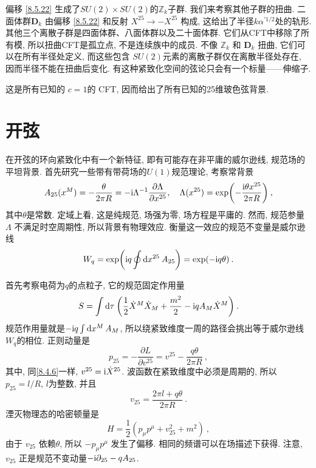 偏移 \eqref{8.5.22} 生成了$S U(2) \times S U(2) $的$\mathds{Z}_{k}$子群. 我们来考察其他子群的扭曲. 
二面体群$\mathbf{D}_{k}$ 由偏移 \eqref{8.5.22} 和反射 $X^{25} \rightarrow-X^{25}$ 构成, 这给出了半径$k \alpha^{\prime 1/2}$处的轨形. 
其他三个离散子群是四面体群、八面体群以及二十面体群. 它们从CFT中移除了所有模, 所以扭曲CFT是孤立点, 不是连续族中的成员. 
不像 $\mathds{Z}_{k}$ 和 $\mathbf{D}_{k}$ 扭曲, 它们可以在所有半径处定义, 而这些包含 $S U(2)$元素的离散子群仅在离散半径处存在, 
因而半径不能在扭曲后变化. 有这种紧致化空间的弦论只会有一个标量——伸缩子. 

这是所有已知的 $c=1$的 CFT, 因而给出了所有已知的25维玻色弦背景.


\section{开弦} \label{sec:8.6}%

在开弦的环向紧致化中有一个新特征, 即有可能存在非平庸的威尔逊线, 规范场的平坦背景. 首先研究一些带有带荷场的$U(1)$规范理论, 考察常背景
\begin{equation}
	A_{25}(x^{M})=-\frac{\theta}{2 \pi R}=-\mathrm{i} \Lambda^{-1} \frac{\partial \Lambda}{\partial x^{25}}, \quad 
	\Lambda(x^{25})=\exp \biggl(-\frac{\mathrm{i} \theta x^{25}}{2 \pi R}\biggr) \:, \label{8.6.1}
\end{equation}
其中$\theta$是常数. 定域上看, 这是纯规范, 场强为零, 场方程是平庸的. 然而, 规范参量 $\Lambda$ 不满足时空周期性, 所以背景有物理效应. 
衡量这一效应的规范不变量是威尔逊线
\begin{equation}
	W_{q}=\exp \biggl(\mathrm{i} q \oint \mathrm{d} x^{25}\: A_{25}\biggr)=\exp (-\mathrm{i} q \theta) \:. \label{8.6.2}
\end{equation}

首先考察电荷为$q$的点粒子, 它的规范固定作用量
\begin{equation}
	S=\int \mathrm{d} \tau \: \biggl(\frac{1}{2} \dot{X}^{M} \dot{X}_{M}+\frac{m^{2}}{2}-\mathrm{i} q A_{M} \dot{X}^{M}\biggr) \:. \label{8.6.3}
\end{equation}
规范作用量就是$-\mathrm{i} q \int \mathrm{d} x^{M}\, A_{M}$, 所以绕紧致维度一周的路径会挑出等于威尔逊线 $W_{q} $的相位. 正则动量是
\begin{equation}
	p_{25}=-\frac{\partial L}{\partial v^{25}}=v^{25}-\frac{q \theta}{2 \pi R} \:, \label{8.6.4}
\end{equation}
其中, 同\eqref{8.4.6}一样, $v^{25}=\mathrm{i} \dot{X}^{25}$. 波函数在紧致维度中必须是周期的, 所以 $p_{25}=l/R$, $l$为整数, 并且
\begin{equation}
	v_{25}=\frac{2 \pi l+q \theta}{2 \pi R} \:. \label{8.6.5}
\end{equation}
湮灭物理态的哈密顿量是
\begin{equation}
	H=\frac{1}{2} (p_{\mu} p^{\mu}+v_{25}^{2}+m^{2}) \:, \label{8.6.6}
\end{equation}
由于 $v_{25}$ 依赖$\theta$, 所以 $-p_{\mu} p^{\mu}$ 发生了偏移. 相同的频谱可以在场描述下获得. 
注意, $v_{25}$ 正是规范不变动量$-\mathrm{i} \partial_{25}-q A_{25}$.

